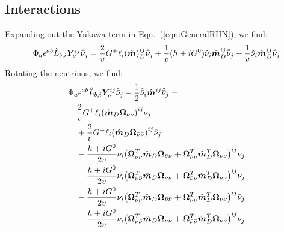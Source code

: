\documentclass[a4paper,11pt]{article} \pdfoutput=1
\newcommand{\rhn}{\bar{\nu}}
\newcommand{\OmegaVVb}{\bm{\Omega}_{\nu\nu}}
\newcommand{\OmegaVNb}{\bm{\Omega}_{\nu\rhn}}
\newcommand{\OmegaNVb}{\bm{\Omega}_{\rhn\nu}}
\newcommand{\OmegaNNb}{\bm{\Omega}_{\rhn\rhn}}
\begin{document}
\subsection{Interactions}
Expanding out the Yukawa term in Eqn.~(\ref{eqn:GeneralRHN}), we find:
\begin{align}
	\Phi_{a}\epsilon^{ab}\hat{L}_{b,i}\bm{Y}^{ij}_{\nu}\hat{\rhn}_{j}
	= \frac{2}{v}G^{+}\ell_{i}\qty(\hat{\bm{m}})^{ij}_{D}\hat{\rhn}_j +
	\frac{1}{v}(h + iG^{0})\hat{\nu}_i\hat{\bm{m}}^{ij}_{D}\hat{\rhn}_{j}
	+ \frac{1}{v}\hat{\nu}_i\hat{\bm{m}}^{ij}_{D}\hat{\rhn}_{j}
\end{align}
Rotating the neutrinos, we find:
\begin{align}
	 & \Phi_{a}\epsilon^{ab}\hat{L}_{b,i}\bm{Y}^{ij}_{\nu}\hat{\rhn}_{j}
	- \frac{1}{2}\hat{\rhn}_i\hat{\bm{m}}^{ij}\hat{\rhn}_j=              \\
	 & \quad
	\frac{2}{v}G^{+}\ell_{i}\qty(\hat{\bm{m}}_{D}\OmegaNVb)^{ij}\nu_{j}
	\notag                                                               \\
	 & \quad
	+ \frac{2}{v}G^{+}\ell_{i}\qty(\hat{\bm{m}}_{D}\OmegaNNb)^{ij}\rhn_{j}
	\notag                                                               \\
	 & \quad
	- \frac{h+iG^{0}}{2v}\nu_i\qty(
	\OmegaVVb^{T}\hat{\bm{m}}_{D}\OmegaNVb +
	\OmegaNVb^{T}\hat{\bm{m}}^{T}_{D}\OmegaVVb
	)^{ij}\nu_{j}
	\notag                                                               \\
	 & \quad
	- \frac{h+iG^{0}}{2v}\rhn_i\qty(
	\OmegaVNb^{T}\hat{\bm{m}}_{D}\OmegaNVb +
	\OmegaNVb^{T}\hat{\bm{m}}^{T}_{D}\OmegaVNb
	)^{ij}\nu_{j}
	\notag                                                               \\
	 & \quad
	- \frac{h+iG^{0}}{2v}\nu_i\qty(
	\OmegaVVb^{T}\hat{\bm{m}}_{D}\OmegaNNb +
	\OmegaNNb^{T}\hat{\bm{m}}^{T}_{D}\OmegaVVb
	)^{ij}\rhn_{j}
	\notag                                                               \\
	 & \quad
	- \frac{h+iG^{0}}{2v}\rhn_i\qty(
	\OmegaVNb^{T}\hat{\bm{m}}_{D}\OmegaNNb +
	\OmegaNNb^{T}\hat{\bm{m}}^{T}_{D}\OmegaVNb
	)^{ij}\rhn_{j}
	\notag                                                               \\

\end{align}
\end{document}
